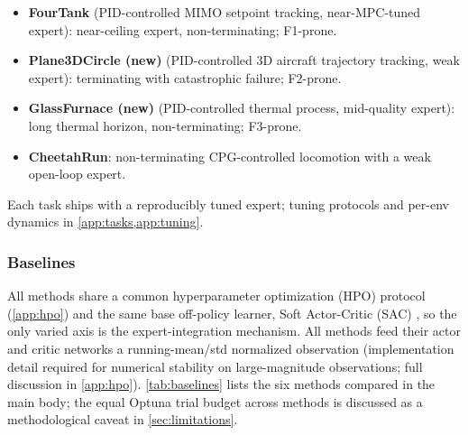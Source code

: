 \documentclass{article}
\begin{document}
\begin{itemize}[leftmargin=1.3em,itemsep=1pt,topsep=2pt]
\item \textbf{FourTank} (PID-controlled MIMO setpoint tracking,
near-MPC-tuned expert): near-ceiling expert, non-terminating; F1-prone.
\item \textbf{Plane3DCircle (new)} (PID-controlled 3D aircraft
trajectory tracking, weak expert): terminating with catastrophic
failure; F2-prone.
\item \textbf{GlassFurnace (new)} (PID-controlled thermal process,
mid-quality expert): long thermal horizon, non-terminating;
F3-prone.
\item \textbf{CheetahRun}: non-terminating CPG-controlled locomotion
with a weak open-loop expert.
\end{itemize}

Each task ships with a reproducibly tuned expert; tuning protocols
and per-env dynamics in \cref{app:tasks,app:tuning}.

\subsubsection{Baselines}
\label{sec:baselines}

All methods share a common hyperparameter optimization (HPO)
protocol (\cref{app:hpo}) and the same base off-policy learner,
Soft Actor-Critic (SAC) \citep{haarnoja2018sac}, so the only varied
axis is the expert-integration mechanism. All methods feed their
actor and critic networks a running-mean/std normalized observation
(implementation detail required for numerical stability on
large-magnitude observations; full discussion in
\cref{app:hpo}). \cref{tab:baselines} lists the six methods compared
in the main body; the equal Optuna \citep{akiba2019optuna} trial
budget across methods is discussed as a methodological caveat in
\cref{sec:limitations}.
\end{document}
